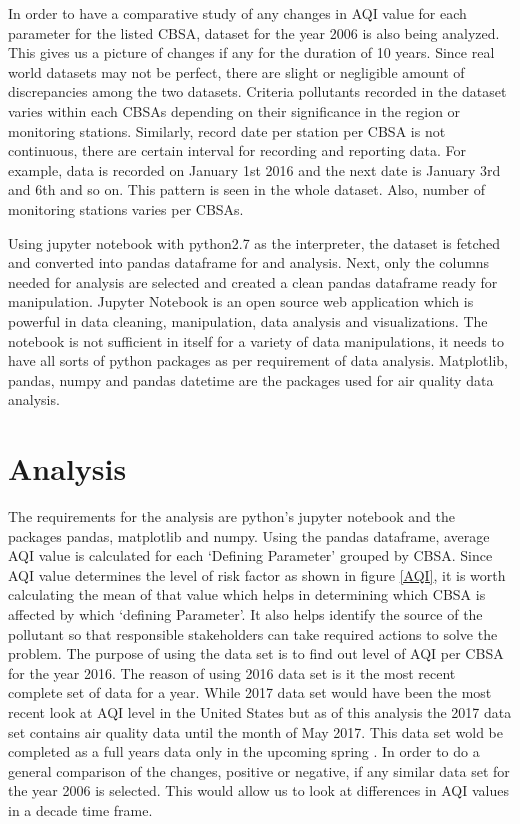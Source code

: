 \documentclass[sigconf]{acmart}
\begin{document}
   In order to have a comparative study of any changes in AQI value for each parameter for the listed CBSA, dataset for the year 2006 is also being analyzed. This gives us a picture of changes if any for the duration of 10 years. Since real world datasets may not be perfect, there are slight or negligible amount of discrepancies among the two datasets.
   Criteria pollutants recorded in the dataset varies within each CBSAs depending on their significance in the region or monitoring stations. Similarly, record date per station per CBSA is not continuous, there are certain interval for recording and reporting data. For example, data is recorded on January 1st 2016 and the next date is January 3rd and 6th and so on. This pattern is seen in the whole dataset. Also, number of monitoring stations varies per CBSAs.

   Using jupyter notebook with python2.7 as the interpreter, the dataset is fetched and converted into pandas dataframe for  and analysis. Next, only the columns needed for analysis are   selected and created a clean pandas dataframe ready for manipulation. Jupyter Notebook is an open source web application which is powerful in data cleaning, manipulation, data analysis and visualizations. The notebook is not sufficient in itself for a variety of data manipulations, it needs to have all sorts of python packages as per requirement of data analysis. Matplotlib, pandas, numpy and pandas datetime are the packages used for air quality data analysis.  


\section{Analysis}
   The requirements for the analysis are python's jupyter notebook and the packages pandas, matplotlib and numpy. Using the pandas dataframe, average AQI value is calculated for each `Defining Parameter' grouped by CBSA.  Since AQI value determines the level of risk factor as shown in figure \ref{AQI}, it is worth calculating the mean of that value which helps in determining which CBSA is affected by which `defining Parameter'. It also helps identify the source of the pollutant so that responsible stakeholders can take required actions to solve the problem. The purpose of using the data set is to find out level of AQI per CBSA  for the year 2016. The reason of using 2016 data set is it the most recent complete set of data for a year. While 2017 data set would have been the most recent look at AQI level in the United States but as of this analysis the 2017 data set contains air quality data until the month of May 2017. This data set wold be completed as a full years data only in the upcoming spring \cite{outdoor-air}. In order to do a general comparison of the changes, positive or negative, if any similar data set for the year 2006 is selected. This would allow us to look at differences in AQI values in a decade time frame. 
\end{document}
